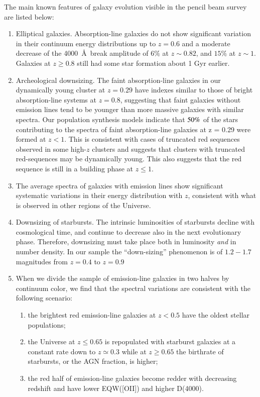 \documentclass[referee]{aa}
\begin{document}
The main known features of galaxy evolution visible in the
pencil beam survey are listed below:
\begin{enumerate}

\item Elliptical galaxies. Absorption-line galaxies do not show significant variation in their continuum energy distributions up to $z = 0.6$ and a moderate decrease of the 4000~\AA\  break amplitude of $6\%$ at $z \sim 0.82$, and $15\%$ at $z \sim 1$.  
Galaxies at $z \geq 0.8$ still had some star formation about 1 Gyr earlier. 

\item Archeological downsizing. The faint absorption-line galaxies in our dynamically young cluster at  
$z = 0.29$ have indexes similar to those of bright absorption-line systems at $z = 0.8$, suggesting that faint galaxies without emission lines tend 
to be younger than  more massive galaxies with similar spectra.  Our population synthesis models indicate that $\rm 50 \%$ of the stars contributing 
to the spectra of faint absorption-line galaxies at z = 0.29 were formed at $z < 1$. This is consistent with cases of truncated red sequences observed in some 
high-$z$ clusters and suggests that clusters with truncated red-sequences may be dynamically young. This also suggests that the red sequence
is still in a building phase at $z \leq 1$.

\item The average spectra of galaxies with emission lines show significant systematic variations in their energy distribution 
with $z$, consistent with what is observed in other regions of the Universe. 

\item Downsizing of starbursts. The intrinsic luminosities of starbursts decline with cosmological time,
and continue to decrease also in the next evolutionary phase. Therefore, downsizing
must take place  both in luminosity {\it and} in number density. In our sample the ``down-sizing'' phenomenon is of $1.2-1.7$ magnitudes from $z = 0.4$ to $z = 0.9$

\item When we divide the sample of emission-line galaxies in two halves by continuum color, we find that the spectral variations are consistent with the following scenario: 

\begin{enumerate} 
   \item the brightest red emission-line galaxies at $z < 0.5$ have the oldest stellar populations; 
   \item the Universe at $z \leq 0.65$ is repopulated with starburst galaxies at a constant rate down
	to $z\simeq0.3$ while at $z \geq 0.65$ the birthrate of starbursts, or the AGN fraction, is higher;
   \item the red half of emission-line galaxies become redder with decreasing redshift and have lower EQW([OII]) and higher D(4000).
\end{enumerate}


\end{enumerate}
\end{document}
